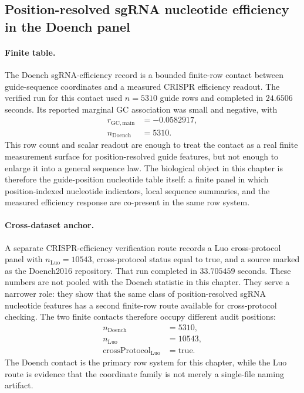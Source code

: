\subsection{Position-resolved sgRNA nucleotide efficiency in the Doench panel}
\label{subsec:bioreality-crispr-efficiency-sgrna-position-nt-efficiency-doench2016}

\paragraph{Finite table.}
The Doench sgRNA-efficiency record is a bounded finite-row contact between guide-sequence coordinates and a measured CRISPR efficiency readout.  The verified run for this contact used $n=5310$ guide rows and completed in $24.6506$ seconds.  Its reported marginal GC association was small and negative, with
$$
\begin{aligned}
  r_{\mathrm{GC},\mathrm{main}} &= -0.0582917,\\
  n_{\mathrm{Doench}} &= 5310.
\end{aligned}
$$
This row count and scalar readout are enough to treat the contact as a real finite measurement surface for position-resolved guide features, but not enough to enlarge it into a general sequence law.  The biological object in this chapter is therefore the guide-position nucleotide table itself: a finite panel in which position-indexed nucleotide indicators, local sequence summaries, and the measured efficiency response are co-present in the same row system.

\paragraph{Cross-dataset anchor.}
A separate CRISPR-efficiency verification route records a Luo cross-protocol panel with $n_{\mathrm{Luo}}=10543$, cross-protocol status equal to true, and a source marked as the Doench2016 repository.  That run completed in $33.705459$ seconds.  These numbers are not pooled with the Doench statistic in this chapter.  They serve a narrower role: they show that the same class of position-resolved sgRNA nucleotide features has a second finite-row route available for cross-protocol checking.  The two finite contacts therefore occupy different audit positions:
$$
\begin{aligned}
  n_{\mathrm{Doench}} &= 5310,\\
  n_{\mathrm{Luo}} &= 10543,\\
  \mathrm{crossProtocol}_{\mathrm{Luo}} &= \mathrm{true}.
\end{aligned}
$$
The Doench contact is the primary row system for this chapter, while the Luo route is evidence that the coordinate family is not merely a single-file naming artifact.

